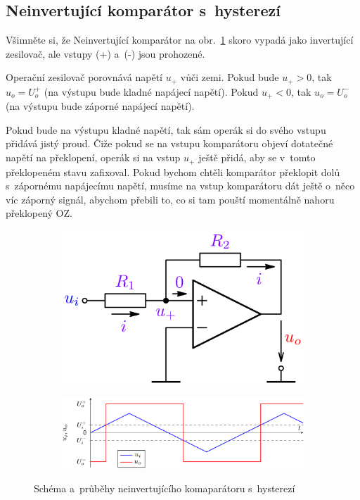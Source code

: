 \documentclass[a4paper,12pt]{article}   %
\begin{document}
\subsection*{Neinvertující komparátor s~hysterezí}
Všimněte si, že Neinvertující komparátor na obr.~\ref{fig:neinvert:komp} skoro vypadá jako invertující zesilovač, ale vstupy (+) a~(-) jsou prohozené.

Operační zesilovač porovnává napětí $u_+$ vůči zemi. Pokud bude $u_+ > 0$, tak $u_o = U_o^+$ (na výstupu bude kladné napájecí napětí). Pokud $u_+ < 0$, tak $u_o = U_o^-$ (na výstupu bude záporné napájecí napětí).

Pokud bude na výstupu kladné napětí, tak sám operák si do svého vstupu přidává jistý proud. Čiže pokud se na vstupu komparátoru objeví dotatečné napětí na překlopení, operák si na vstup $u_+$ ještě přidá, aby se v~tomto překlopeném stavu zafixoval. Pokud bychom chtěli komparátor překlopit dolů s~zápornému napájecímu napětí, musíme na vstup komparátoru dát ještě o~něco víc záporný signál, abychom přebili to, co si tam pouští momentálně nahoru překlopený OZ.


\begin{figure}[h!]
    \centering
    \begin{subfigure}{.3\textwidth}
        \centering
        \includegraphics[width=\textwidth]{komparator-noninvert.PNG}
    \end{subfigure}
    \begin{subfigure}{.65\textwidth}
        \centering
        \includegraphics[width=\textwidth]{komparator-noninvert-graf.PNG}
    \end{subfigure}
    \caption{Schéma a~průběhy neinvertujícího komaparátoru s~hysterezí}
    \label{fig:neinvert:komp}
\end{figure}
\end{document}
